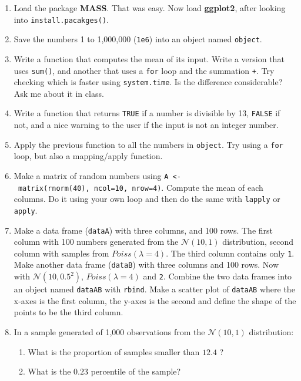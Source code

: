 \documentclass[]{book}
\providecommand{\tightlist}{%
  \setlength{\itemsep}{0pt}\setlength{\parskip}{0pt}}
\theoremstyle{definition}
\theoremstyle{definition}
\theoremstyle{definition}
\theoremstyle{remark}
\begin{document}
\begin{enumerate}
\def\labelenumi{\arabic{enumi}.}
\item
  Load the package \textbf{MASS}. That was easy. Now load
  \textbf{ggplot2}, after looking into \texttt{install.pacakges()}.
\item
  Save the numbers 1 to 1,000,000 (\texttt{1e6}) into an object named
  \texttt{object}.
\item
  Write a function that computes the mean of its input. Write a version
  that uses \texttt{sum()}, and another that uses a \texttt{for} loop
  and the summation \texttt{+}. Try checking which is faster using
  \texttt{system.time}. Is the difference considerable? Ask me about it
  in class.
\item
  Write a function that returns \texttt{TRUE} if a number is divisible
  by 13, \texttt{FALSE} if not, and a nice warning to the user if the
  input is not an integer number.
\item
  Apply the previous function to all the numbers in \texttt{object}. Try
  using a \texttt{for} loop, but also a mapping/apply function.
\item
  Make a matrix of random numbers using
  \texttt{A\ \textless{}-\ matrix(rnorm(40),\ ncol=10,\ nrow=4)}.
  Compute the mean of each columns. Do it using your own loop and then
  do the same with \texttt{lapply} or \texttt{apply}.
\item
  Make a data frame (\texttt{dataA}) with three columns, and 100 rows.
  The first column with 100 numbers generated from the
  \(\mathcal{N}(10,1)\) distribution, second column with samples from
  \(Poiss(\lambda=4)\). The third column contains only \texttt{1}.\\
  Make another data frame (\texttt{dataB}) with three columns and 100
  rows. Now with \(\mathcal{N}(10,0.5^2)\), \(Poiss(\lambda=4)\) and
  \texttt{2}. Combine the two data frames into an object named
  \texttt{dataAB} with \texttt{rbind}. Make a scatter plot of
  \texttt{dataAB} where the x-axes is the first column, the y-axes is
  the second and define the shape of the points to be the third column.
\item
  In a sample generated of 1,000 observations from the
  \(\mathcal{N}(10,1)\) distribution:

  \begin{enumerate}
  \def\labelenumii{\arabic{enumii}.}
  \tightlist
  \item
    What is the proportion of samples smaller than \(12.4\) ?
  \item
    What is the \(0.23\) percentile of the sample?
  \end{enumerate}
\end{enumerate}
\end{document}
